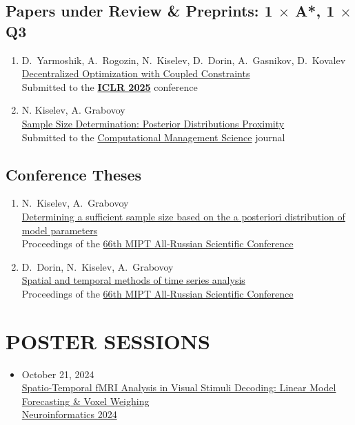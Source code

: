 \documentclass[11pt,a4paper]{moderncv}
\begin{document}
\subsection{Papers under Review \& Preprints: 1 $\times$ A*, 1 $\times$ Q3}
\begin{enumerate}%
    \item D.~Yarmoshik, A.~Rogozin, N.~Kiselev, D.~Dorin, A.~Gasnikov, D.~Kovalev\\
    \href{https://arxiv.org/abs/2407.02020}{Decentralized Optimization with Coupled Constraints}\\
    Submitted to the \href{https://neurips.cc}{\textbf{ICLR 2025}} conference
    \item N. Kiselev, A. Grabovoy\\
    \href{https://github.com/kisnikser/Posterior-Distributions-Proximity}{Sample Size Determination: Posterior Distributions Proximity}\\
    Submitted to the \href{https://link.springer.com/journal/10287}{Computational Management Science} journal
\end{enumerate}
\subsection{Conference Theses}
\begin{enumerate}%
    \item N.~Kiselev, A.~Grabovoy\\
    \href{https://old.mipt.ru/upload/medialibrary/d79/fpmi.pdf}{Determining a sufficient sample size based on the a posteriori distribution of model parameters}\\
    Proceedings of the \href{https://conf.mipt.ru/}{66th MIPT All-Russian Scientific Conference}
    \item D.~Dorin, N.~Kiselev, A.~Grabovoy\\
    \href{https://old.mipt.ru/upload/medialibrary/d79/fpmi.pdf}{Spatial and temporal methods of time series analysis}\\
    Proceedings of the \href{https://conf.mipt.ru/}{66th MIPT All-Russian Scientific Conference}
\end{enumerate}

\section{POSTER SESSIONS}
\begin{itemize}
    \item October 21, 2024\\
    \href{https://github.com/DorinDaniil/Forecasting-fMRI-Images/blob/main/poster/poster.pdf}{Spatio-Temporal fMRI Analysis in Visual Stimuli Decoding: Linear Model Forecasting \& Voxel Weighing}\\
    \href{https://neuroinfo.ru/index.php/en/}{Neuroinformatics 2024}
\end{itemize}
\end{document}
